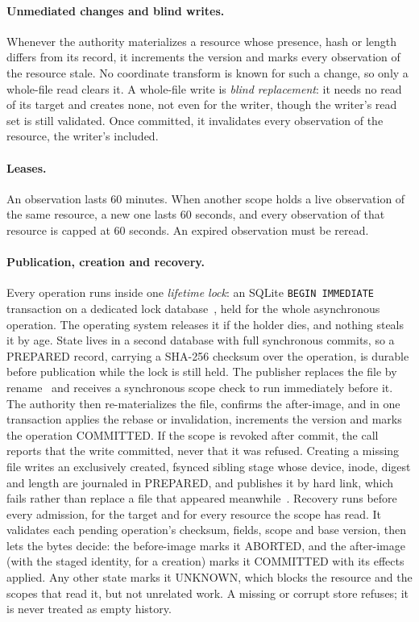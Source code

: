 \documentclass[10pt]{article}
\newcommand{\code}[1]{\texttt{#1}}
\begin{document}
\paragraph{Unmediated changes and blind writes.}
Whenever the authority materializes a resource whose presence, hash or length differs from its record, it increments the version and marks every observation of the resource stale. No coordinate transform is known for such a change, so only a whole-file read clears it. A whole-file write is \emph{blind replacement}: it needs no read of its target and creates none, not even for the writer, though the writer's read set is still validated. Once committed, it invalidates every observation of the resource, the writer's included.

\paragraph{Leases.}
An observation lasts 60 minutes. When another scope holds a live observation of the same resource, a new one lasts 60 seconds, and every observation of that resource is capped at 60 seconds. An expired observation must be reread.

\paragraph{Publication, creation and recovery.}
Every operation runs inside one \emph{lifetime lock}: an SQLite \code{BEGIN IMMEDIATE} transaction on a dedicated lock database~\citep{sqlite-locking,sqlite-transaction}, held for the whole asynchronous operation. The operating system releases it if the holder dies, and nothing steals it by age. State lives in a second database with full synchronous commits, so a PREPARED record, carrying a SHA-256 checksum over the operation, is durable before publication while the lock is still held. The publisher replaces the file by rename~\citep{posix2024rename} and receives a synchronous scope check to run immediately before it. The authority then re-materializes the file, confirms the after-image, and in one transaction applies the rebase or invalidation, increments the version and marks the operation COMMITTED. If the scope is revoked after commit, the call reports that the write committed, never that it was refused. Creating a missing file writes an exclusively created, fsynced sibling stage whose device, inode, digest and length are journaled in PREPARED, and publishes it by hard link, which fails rather than replace a file that appeared meanwhile~\citep{posix2024link}. Recovery runs before every admission, for the target and for every resource the scope has read. It validates each pending operation's checksum, fields, scope and base version, then lets the bytes decide: the before-image marks it ABORTED, and the after-image (with the staged identity, for a creation) marks it COMMITTED with its effects applied. Any other state marks it UNKNOWN, which blocks the resource and the scopes that read it, but not unrelated work. A missing or corrupt store refuses; it is never treated as empty history.
\end{document}
